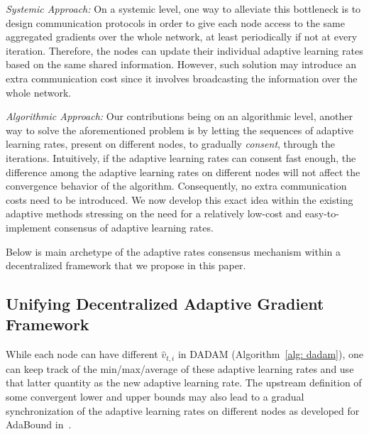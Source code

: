 \documentclass[11pt]{article}
\begin{document}
\textit{Systemic Approach:} 
On a systemic level, one way to alleviate this bottleneck is to design communication protocols in order to give each node access to the same aggregated gradients over the whole network, at least periodically if not at every iteration.
Therefore, the nodes can update their individual adaptive learning rates based on the same shared information. 
However, such solution may introduce an extra communication cost since it involves broadcasting the information over the whole network.

\textit{Algorithmic Approach:} 
Our contributions being on an algorithmic level, another way to solve the aforementioned problem is by letting the sequences of adaptive learning rates, present on different nodes, to gradually \emph{consent}, through the iterations. 
Intuitively, if the adaptive learning rates can consent fast enough, the difference among the adaptive learning rates on different nodes will not affect the convergence behavior of the algorithm.  
Consequently, no extra communication costs need to be introduced.
We now develop this exact idea within the existing adaptive methods stressing on the need for a relatively low-cost and easy-to-implement consensus of adaptive learning rates. 

Below is main archetype of the adaptive rates consensus mechanism within a decentralized framework that we propose in this paper.


\subsection{Unifying Decentralized Adaptive Gradient Framework}



While each node can have different $\hat v_{t,i}$ in DADAM (Algorithm~\ref{alg: dadam}), one can keep track of the min/max/average of these adaptive learning rates and use that latter quantity as the new adaptive learning rate. 
The upstream definition of some convergent lower and upper bounds may also lead to a gradual synchronization of the adaptive learning rates on different nodes as developed for AdaBound in~\cite{luo2019adaptive}.
\end{document}
